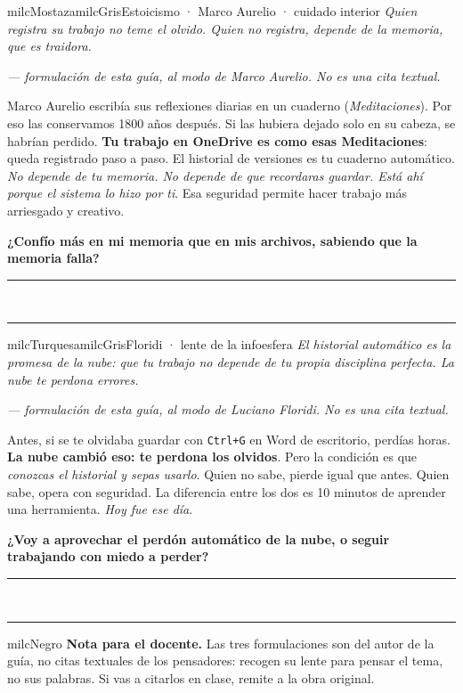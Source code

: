 \documentclass[11pt,letterpaper]{article}
\newcommand{\linead}[1]{\noindent\color{milcLinea}\rule{#1}{0.5pt}\color{milcNegro}}
\begin{document}
\begin{softbox}{milcMostaza}{milcGris}{Estoicismo · Marco Aurelio · cuidado interior}
\textit{Quien registra su trabajo no teme el olvido. Quien no registra, depende de la memoria, que es traidora.}

{\footnotesize\itshape\color{milcNegro!70}--- formulación de esta guía, al modo de Marco Aurelio. No es una cita textual.}

Marco Aurelio escribía sus reflexiones diarias en un cuaderno (\emph{Meditaciones}). Por eso las conservamos 1800 años después. Si las hubiera dejado solo en su cabeza, se habrían perdido. \textbf{Tu trabajo en OneDrive es como esas Meditaciones}: queda registrado paso a paso. El historial de versiones es tu cuaderno automático. \emph{No depende de tu memoria. No depende de que recordaras guardar. Está ahí porque el sistema lo hizo por ti}. Esa seguridad permite hacer trabajo más arriesgado y creativo.

\textbf{¿Confío más en mi memoria que en mis archivos, sabiendo que la memoria falla?}
\end{softbox}
\linead{\linewidth}\\[1mm]
\linead{\linewidth}

\begin{softbox}{milcTurquesa}{milcGris}{Floridi · lente de la infoesfera}
\textit{El historial automático es la promesa de la nube: que tu trabajo no depende de tu propia disciplina perfecta. La nube te perdona errores.}

{\footnotesize\itshape\color{milcNegro!70}--- formulación de esta guía, al modo de Luciano Floridi. No es una cita textual.}

Antes, si se te olvidaba guardar con \texttt{Ctrl+G} en Word de escritorio, perdías horas. \textbf{La nube cambió eso: te perdona los olvidos}. Pero la condición es que \emph{conozcas el historial y sepas usarlo}. Quien no sabe, pierde igual que antes. Quien sabe, opera con seguridad. La diferencia entre los dos es 10 minutos de aprender una herramienta. \emph{Hoy fue ese día}.

\textbf{¿Voy a aprovechar el perdón automático de la nube, o seguir trabajando con miedo a perder?}
\end{softbox}
\linead{\linewidth}\\[1mm]
\linead{\linewidth}

\begin{infoband}{milcNegro}
\textbf{Nota para el docente.} Las tres formulaciones son del autor de la guía, no citas textuales de los pensadores: recogen su lente para pensar el tema, no sus palabras. Si vas a citarlos en clase, remite a la obra original.
\end{infoband}
\end{document}
